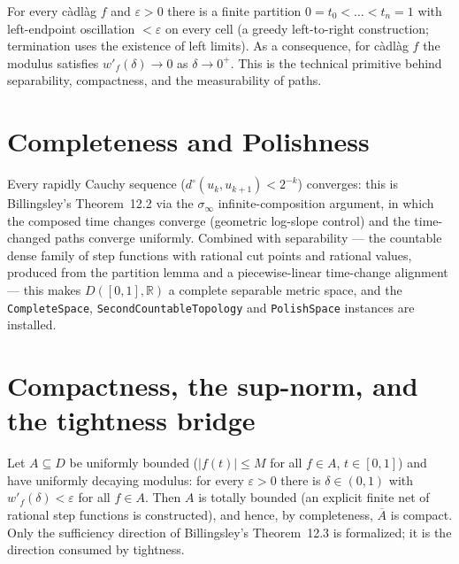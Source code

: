 \begin{lemma}\label{lem:sk-modulus-decay}
  \leanok
  For every c\`adl\`ag $f$ and $\varepsilon>0$ there is a finite partition
  $0=t_0<\dots<t_n=1$ with left-endpoint oscillation $<\varepsilon$ on every cell (a greedy
  left-to-right construction; termination uses the existence of left limits).  As a
  consequence, for c\`adl\`ag $f$ the modulus satisfies $w'_f(\delta)\to 0$ as
  $\delta\to 0^+$.  This is the technical primitive behind separability, compactness, and
  the measurability of paths.
\end{lemma}

\section{Completeness and Polishness}

\begin{theorem}\label{thm:sk-polish}
  \leanok
  Every rapidly Cauchy sequence ($d^\circ(u_k,u_{k+1})<2^{-k}$) converges: this is
  Billingsley's Theorem~12.2 via the $\sigma_\infty$ infinite-composition argument, in
  which the composed time changes converge (geometric log-slope control) and the
  time-changed paths converge uniformly.  Combined with separability --- the countable
  dense family of step functions with rational cut points and rational values, produced
  from the partition lemma and a piecewise-linear time-change alignment --- this makes
  $D([0,1],\mathbb{R})$ a complete separable metric space, and the
  \texttt{CompleteSpace}, \texttt{SecondCountableTopology} and \texttt{PolishSpace}
  instances are installed.
\end{theorem}

\section{Compactness, the sup-norm, and the tightness bridge}

\begin{theorem}\label{thm:sk-compact}
  \leanok
  Let $A\subseteq D$ be uniformly bounded ($|f(t)|\le M$ for all $f\in A$, $t\in[0,1]$) and
  have uniformly decaying modulus: for every $\varepsilon>0$ there is $\delta\in(0,1)$ with
  $w'_f(\delta)<\varepsilon$ for all $f\in A$.  Then $A$ is totally bounded (an explicit
  finite net of rational step functions is constructed), and hence, by completeness,
  $\overline{A}$ is compact.  Only the sufficiency direction of Billingsley's
  Theorem~12.3 is formalized; it is the direction consumed by tightness.
\end{theorem}

